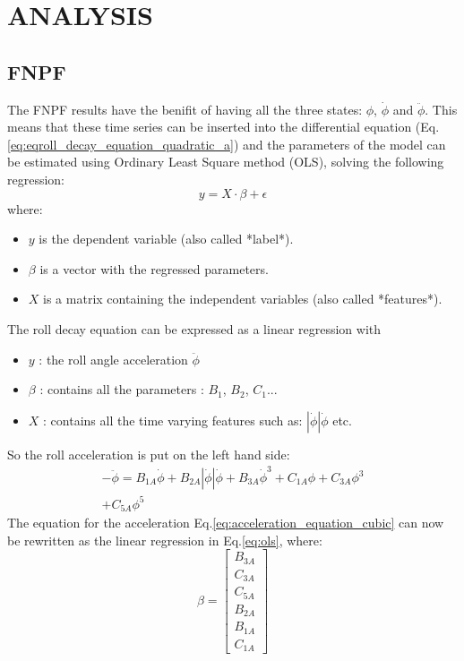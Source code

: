\section*{ANALYSIS}\label{analysis}
\hypertarget{fnpf}{%
\subsection*{FNPF}\label{fnpf}}
The FNPF results have the benifit of having all the three states:
$\phi$, $\dot{\phi}$ and $\ddot{\phi}$. This means that these time
series can be inserted into the differential equation
(Eq.\ref{eq:eqroll_decay_equation_quadratic_a}) and the
parameters of the model can be estimated using Ordinary Least Square
method (OLS), solving the following regression:
\begin{equation}
y = X \cdot \beta + \epsilon
\label{ols}
\end{equation}
where:
\begin{itemize}
\item $y$ is the dependent variable (also called *label*).
\item $\beta$ is a vector with the regressed parameters.
\item $X$ is a matrix containing the independent variables (also called *features*).
\end{itemize}
The roll decay equation can be expressed as a linear regression with
\begin{itemize}
\item $y$ : the roll angle acceleration $\ddot{\phi}$
\item $\beta$ : contains all the parameters : $B_1$, $B_2$, $C_1$...
\item $X$ : contains all the time varying features such as: $| \dot{\phi} | \dot{\phi} $ etc.
\end{itemize}
So the roll acceleration is put on the left hand side:
\begin{equation}
\begin{aligned}
- \ddot{\phi} = B_{1A} \dot{\phi} + B_{2A} \left|{\dot{\phi}}\right| \dot{\phi} + B_{3A} \dot{\phi}^{3} + C_{1A} \phi + C_{3A} \phi^{3} \\ + C_{5A} \phi^{5}
\end{aligned}
\label{acceleration_equation_cubic}
\end{equation}
The equation for the acceleration
Eq.\ref{eq:acceleration_equation_cubic} can now be rewritten as
the linear regression in Eq.\ref{eq:ols}, where:
\begin{equation}
\beta = \left[\begin{matrix}B_{3A}\\C_{3A}\\C_{5A}\\B_{2A}\\B_{1A}\\C_{1A}\end{matrix}\right]
\label{eq_beta}
\end{equation}

